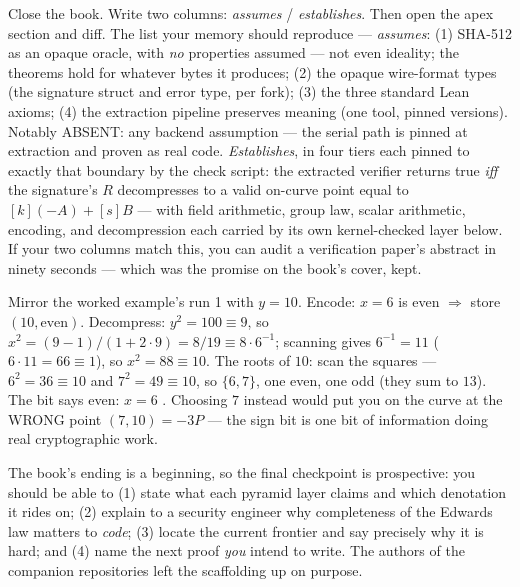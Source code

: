 \pathway Close the book. Write two columns: \emph{assumes} /
\emph{establishes}. Then open the apex section and diff.
\answer The list your memory should reproduce --- \emph{assumes}:
(1) SHA-512 as an opaque oracle, with \emph{no} properties assumed ---
not even ideality; the theorems hold for whatever bytes it produces;
(2) the opaque wire-format types (the signature struct and error type,
per fork); (3) the three standard Lean axioms; (4) the extraction
pipeline preserves meaning (one tool, pinned versions). Notably ABSENT:
any backend assumption --- the serial path is pinned at extraction and
proven as real code. \emph{Establishes}, in four tiers each pinned to
exactly that boundary by the check script: the extracted verifier
returns true \emph{iff} the signature's $R$ decompresses to a valid
on-curve point equal to $[k](-A) + [s]B$ --- with field arithmetic,
group law, scalar arithmetic, encoding, and decompression each carried
by its own kernel-checked layer below. If your two columns match this,
you can audit a verification paper's abstract in ninety seconds ---
which was the promise on the book's cover, kept.

\pathway Mirror the worked example's run 1 with $y = 10$.
\answer Encode: $x = 6$ is even $\Rightarrow$ store $(10, \text{even})$.
Decompress: $y^2 = 100 \equiv 9$, so
$x^2 = (9-1)/(1 + 2\cdot 9) = 8/19 \equiv 8 \cdot 6^{-1}$; scanning gives
$6^{-1} = 11$ ($6 \cdot 11 = 66 \equiv 1$), so $x^2 = 88 \equiv 10$. The
roots of $10$: scan the squares --- $6^2 = 36 \equiv 10$ and
$7^2 = 49 \equiv 10$, so $\{6, 7\}$, one even, one odd (they sum to
$13$). The bit says even: $x = 6$ \checkmark. Choosing $7$ instead would
put you on the curve at the WRONG point $(7,10) = -3P$ --- the sign bit
is one bit of information doing real cryptographic work.

\begin{checkpoint}
The book's ending is a beginning, so the final checkpoint is prospective:
you should be able to (1) state what each pyramid layer claims and which
denotation it rides on; (2) explain to a security engineer why completeness
of the Edwards law matters to \emph{code}; (3) locate the current frontier
and say precisely why it is hard; and (4) name the next proof \emph{you}
intend to write. The authors of the companion repositories left the
scaffolding up on purpose.
\end{checkpoint}

